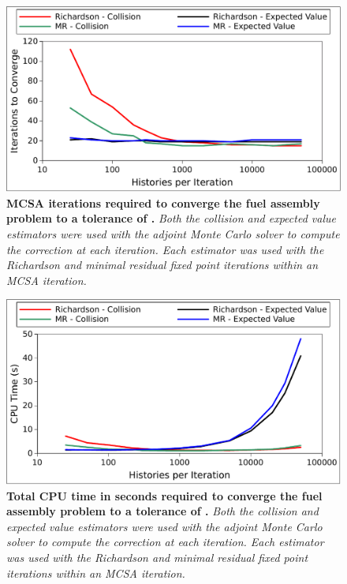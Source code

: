 \begin{figure}[t!]
  \begin{center}
    \includegraphics[width=5in]{chapters/spn_equations/estimator_iters.pdf}
  \end{center}
  \caption{\textbf{MCSA iterations required to converge the fuel
      assembly problem to a tolerance of .} \textit{Both the
      collision and expected value estimators were used with the
      adjoint Monte Carlo solver to compute the correction at each
      iteration. Each estimator was used with the Richardson and
      minimal residual fixed point iterations within an MCSA
      iteration.}}
  \label{fig:spn_estimator_iters}
\end{figure}

\begin{figure}[t!]
  \begin{center}
    \includegraphics[width=5in]{chapters/spn_equations/estimator_time.pdf}
  \end{center}
  \caption{\textbf{Total CPU time in seconds required to converge the
      fuel assembly problem to a tolerance of .}
    \textit{Both the collision and expected value estimators were used
      with the adjoint Monte Carlo solver to compute the correction at
      each iteration. Each estimator was used with the Richardson and
      minimal residual fixed point iterations within an MCSA
      iteration.}}
  \label{fig:spn_estimator_time}
\end{figure}
